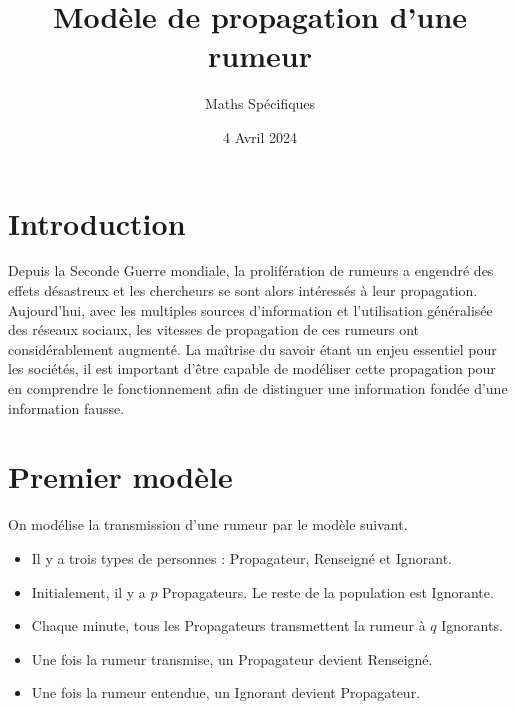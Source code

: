 \documentclass{exam}
\title{Modèle de propagation d'une rumeur}
\date{4 Avril 2024}
\author{Maths Spécifiques}
\begin{document}
\maketitle
\section{Introduction}
Depuis la Seconde Guerre mondiale, la prolifération de rumeurs a engendré
des effets désastreux et les chercheurs se sont alors intéressés à leur
propagation. Aujourd'hui, avec les multiples sources d'information et
l'utilisation généralisée des réseaux sociaux, les vitesses de propagation de ces
rumeurs ont considérablement augmenté. La maîtrise du savoir étant un enjeu
essentiel pour les sociétés, il est important d'être capable de modéliser cette
propagation pour en comprendre le fonctionnement afin de distinguer une
information fondée d'une information fausse.

\section{Premier modèle}

On modélise la transmission d'une rumeur par le modèle suivant.

\begin{tcolorbox}
\begin{itemize}
\item Il y a trois types de personnes : Propagateur, Renseigné et Ignorant.
\item Initialement, il y a $p$ Propagateurs. Le reste de la population est Ignorante.
\item Chaque minute, tous les Propagateurs transmettent la rumeur à $q$ Ignorants.
\item Une fois la rumeur transmise, un Propagateur devient Renseigné.
\item Une fois la rumeur entendue, un Ignorant devient Propagateur.
\end{itemize}
\end{tcolorbox}
\vspace*{0.5cm}
\end{document}
